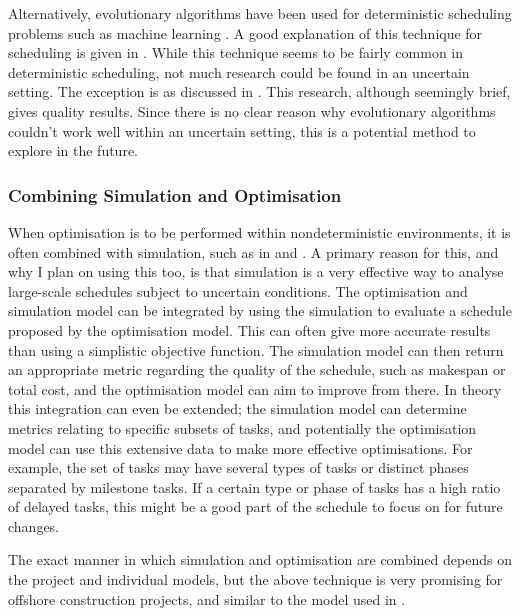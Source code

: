 \documentclass[a4paper,12pt]{article}
\begin{document}
Alternatively, evolutionary algorithms have been used for deterministic scheduling problems such as machine learning \cite{dorndorf1995evolution}. A good explanation of this technique for scheduling is given in \cite{cotta2007memetic}. While this technique seems to be fairly common in deterministic scheduling, not much research could be found in an uncertain setting. The exception is \cite{sevaux2002genetic} as discussed in . This research, although seemingly brief, gives quality results. Since there is no clear reason why evolutionary algorithms couldn't work well within an uncertain setting, this is a potential method to explore in the future. 

\subsubsection{Combining Simulation and Optimisation} \label{ss:simopt}
When optimisation is to be performed within nondeterministic environments, it is often combined with simulation, such as in \cite{de2003integrating} and \cite{bard2015integrating}. A primary reason for this, and why I plan on using this too, is that simulation is a very effective way to analyse large-scale schedules subject to uncertain conditions. The optimisation and simulation model can be integrated by using the simulation to evaluate a schedule proposed by the optimisation model. This can often give more accurate results than using a simplistic objective function. The simulation model can then return an appropriate metric regarding the quality of the schedule, such as makespan or total cost, and the optimisation model can aim to improve from there. In theory this integration can even be extended; the simulation model can determine metrics relating to specific subsets of tasks, and potentially the optimisation model can use this extensive data to make more effective optimisations. For example, the set of tasks may have several types of tasks or distinct phases separated by milestone tasks. If a certain type or phase of tasks has a high ratio of delayed tasks, this might be a good part of the schedule to focus on for future changes. 

The exact manner in which simulation and optimisation are combined depends on the project and individual models, but the above technique is very promising for offshore construction projects, and similar to the model used in \cite{kerkhove2017optimised}. 

\end{document}
